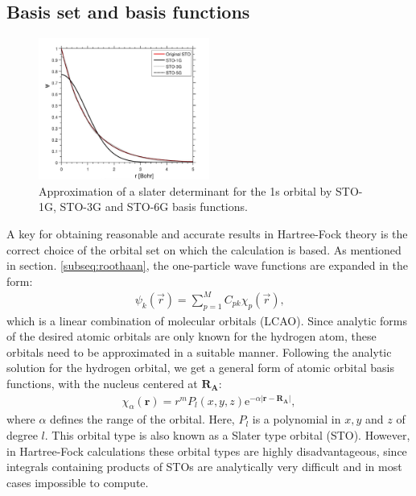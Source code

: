 \documentclass[twoside,        %
			   11pt,			%
               BCOR10mm,       %
               ngerman,english  %
               ]{scrartcl}
\begin{document}
\subsection{Basis set and basis functions}\label{subsec:Basis}
\begin{figure}[h!]
\centering
\includegraphics[width=0.5\textwidth]{figures/1228px-Gauss_sto4.png}
\caption{Approximation of a slater determinant for the 1s orbital by STO-1G, STO-3G and STO-6G basis functions. \cite{pict}}
\label{fig:STO_GTO}
\end{figure}

A key for obtaining reasonable and accurate results in Hartree-Fock theory is the correct choice of the orbital set on which the calculation is based. As mentioned in section. \ref{subseq:roothaan}, the one-particle wave functions are expanded in the form:
\begin{align*}
    \psi_k(\vec{r}) = \sum_{p=1}^M C_{pk} \chi_p (\vec{r})\text{,}
\end{align*} which is a linear combination of molecular orbitals (LCAO).
Since analytic forms of the desired atomic orbitals are only known for the hydrogen atom, these orbitals need to be approximated in a suitable manner. Following the analytic solution for the hydrogen orbital, we get a general form of atomic orbital basis functions, with the nucleus centered at $\mathbf{R_\text{A}}$:
\begin{align*}
\chi_\alpha (\mathbf{r}) = r^m P_l (x,y,z) \text{e}^{-\alpha |\mathbf{r-R_\text{A}}|},
\end{align*}
where $\alpha$ defines the range of the orbital. Here, $P_l$ is a polynomial in $x,y$ and $z$ of degree $l$. This orbital type is also known as a Slater type orbital (STO). However, in Hartree-Fock calculations these orbital types are highly disadvantageous, since integrals containing products of STOs are analytically very difficult and in most cases impossible to compute.
\end{document}
